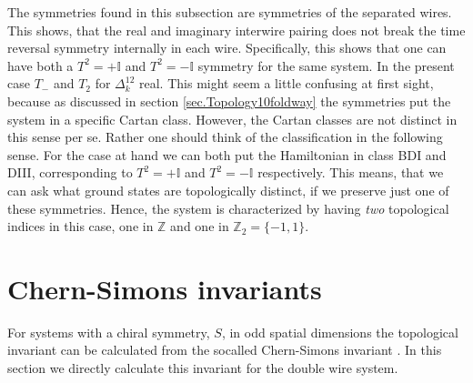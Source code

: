 The symmetries found in this subsection are symmetries of the separated wires. This shows, that the real and imaginary interwire pairing does not break the time reversal symmetry internally in each wire. Specifically, this shows that one can have both a $T^2 = +\mathbb{I}$ and $T^2 = -\mathbb{I}$ symmetry for the same system. In the present case $T_-$ and $T_2$ for $\Delta^{12}_k$ real. This might seem a little confusing at first sight, because as discussed in section \ref{sec.Topology10foldway} the symmetries put the system in a specific Cartan class. However, the Cartan classes are not distinct in this sense per se. Rather one should think of the classification in the following sense. For the case at hand we can both put the Hamiltonian in class BDI and DIII, corresponding to $T^2 = +\mathbb{I}$ and $T^2=-\mathbb{I}$ respectively. This means, that we can ask what ground states are topologically distinct, if we preserve just one of these symmetries. Hence, the system is characterized by having \textit{two} topological indices in this case, one in $\mathbb{Z}$ and one in $\mathbb{Z}_2 = \{-1,1\}$.

\section{Chern-Simons invariants}
\label{sec.2wires_CSinv}
For systems with a chiral symmetry, $S$, in odd spatial dimensions the topological invariant can be calculated from the socalled Chern-Simons invariant \cite{Ryu.Topology}. In this section we directly calculate this invariant for the double wire system.

